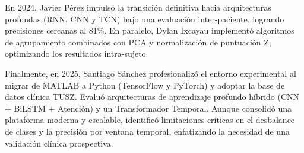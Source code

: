 En 2024, Javier Pérez \cite{Perez_2024} impulsó la transición definitiva hacia arquitecturas profundas (RNN, CNN y TCN) bajo una evaluación inter-paciente, logrando precisiones cercanas al 81\%. En paralelo, Dylan Ixcayau \cite{Ixcayau_2024} implementó algoritmos de agrupamiento combinados con PCA y normalización de puntuación Z, optimizando los resultados intra-sujeto.

Finalmente, en 2025, Santiago Sánchez \cite{Sanchez_2025} profesionalizó el entorno experimental al migrar de MATLAB a Python (TensorFlow y PyTorch) y adoptar la base de datos clínica TUSZ. Evaluó arquitecturas de aprendizaje profundo híbrido (CNN + BiLSTM + Atención) y un Transformador Temporal. Aunque consolidó una plataforma moderna y escalable, identificó limitaciones críticas en el desbalance de clases y la precisión por ventana temporal, enfatizando la necesidad de una validación clínica prospectiva.